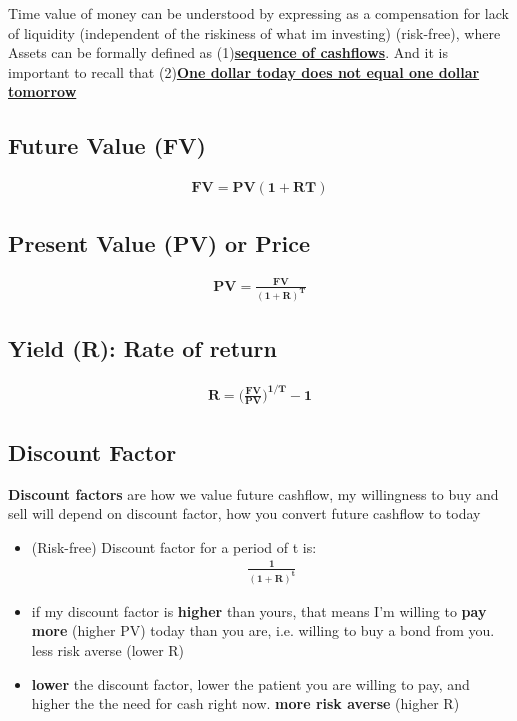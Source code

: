 Time value of money can be understood by expressing as a compensation for lack of liquidity (independent of the riskiness of what im investing) (risk-free), where
Assets can be formally defined as (1)\underline{\textbf{sequence of cashflows}}. And it is important to recall that (2)\underline{\textbf{One dollar today does not equal one dollar tomorrow}}

\begin{multicols}{2}

\subsection{Future Value (FV)}
\begin{gather*}
    \mathbf{FV = PV(1+RT)}
\end{gather*}

\subsection{Present Value (PV) or Price}
\begin{gather*}
    \mathbf{PV = \frac{FV}{(1+R)^T}}
\end{gather*}
       
\subsection{Yield (R): Rate of return}
\begin{gather*}
    \mathbf{R = \Big(\frac{FV}{PV}\Big)^{1/T}-1}
\end{gather*}

\subsection{Discount Factor}
\textbf{Discount factors} are how we value future cashflow, my willingness to buy and sell will depend on discount factor, how you convert future cashflow to today
\begin{itemize}
    \item (Risk-free) Discount factor for a period of t is:
        \begin{gather*}
            \mathbf{\frac{1}{(1+R)^t}}
        \end{gather*}
    \item if my discount factor is \textbf{higher} than yours, that means I'm willing to \textbf{pay more} (higher PV) today than you are, i.e. willing to buy a bond from you. less risk averse (lower R)
    \item \textbf{lower} the discount factor, lower the patient you are willing to pay, and higher the the need for cash right now. \textbf{more risk averse} (higher R)
\end{itemize}


\end{multicols}
